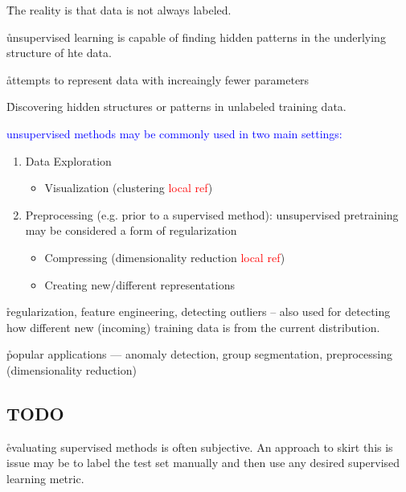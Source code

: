 \r{The reality is that data is not always labeled.}

\r{unsupervised learning is capable of finding hidden patterns in the underlying structure of hte data.}

\r{attempts to represent data with increaingly fewer parameters}

\r{Discovering hidden structures or patterns in unlabeled training data.}


\textcolor{blue}{unsupervised methods may be commonly used in two main settings:}
\begin{enumerate}[noitemsep,topsep=0pt]
	\item Data Exploration
	\begin{itemize}[noitemsep,topsep=0pt]
		\item Visualization (clustering \textcolor{red}{local ref})
	\end{itemize}
	\item Preprocessing (e.g. prior to a supervised method): unsupervised pretraining may be considered a form of regularization
	\begin{itemize}[noitemsep,topsep=0pt]
		\item Compressing (dimensionality reduction \textcolor{red}{local ref})
		\item Creating new/different representations
	\end{itemize}
\end{enumerate}

\r{regularization, feature engineering, detecting outliers -- also used for detecting how different new (incoming) training data is from the current distribution.}

\r{popular applications --- anomaly detection, group segmentation, preprocessing (dimensionality reduction)}

\subsection{TODO}


\r{evaluating supervised methods is often subjective. An approach to skirt this is issue may be to label the test set manually and then use any desired supervised learning metric.}

